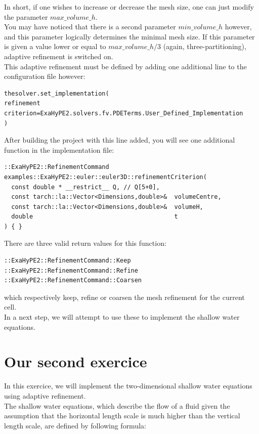 \documentclass[12pt,letterpaper]{article}
\begin{document}
In short, if one wishes to increase or decrease the mesh size, one can just modify the parameter $max\_volume\_h$.\\
You may have noticed that there is a second parameter $min\_volume\_h$ however, and this parameter logically determines the minimal mesh size. If this parameter is given a value lower or equal to $max\_volume\_h / 3$ (again, three-partitioning), adaptive refinement is switched on.\\
This adaptive refinement must be defined by adding one additional line to the configuration file however:\\

\begin{lstlisting}[style = Python]
thesolver.set_implementation(
refinement criterion=ExaHyPE2.solvers.fv.PDETerms.User_Defined_Implementation
)
\end{lstlisting}

After building the project with this line added, you will see one additional function in the implementation file:

\begin{lstlisting}[style = C++]
::ExaHyPE2::RefinementCommand examples::ExaHyPE2::euler::euler3D::refinementCriterion(
  const double * __restrict__ Q, // Q[5+0],
  const tarch::la::Vector<Dimensions,double>&  volumeCentre,
  const tarch::la::Vector<Dimensions,double>&  volumeH,
  double                                       t
) { }
\end{lstlisting}

There are three valid return values for this function:

\begin{lstlisting}[style = C++]
::ExaHyPE2::RefinementCommand::Keep
::ExaHyPE2::RefinementCommand::Refine
::ExaHyPE2::RefinementCommand::Coarsen
\end{lstlisting}

which respectively keep, refine or coarsen the mesh refinement for the current cell.\\
In a next step, we will attempt to use these to implement the shallow water equations.

\newpage

\section{Our second exercice}

In this exercice, we will implement the two-dimensional shallow water equations using adaptive refinement.\\
The shallow water equations, which describe the flow of a fluid given the assumption that the horizontal length scale is much higher than the vertical length scale, are defined by following formula:
\end{document}
